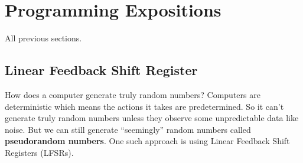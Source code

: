 \section{Programming Expositions}
\begin{topics}
All previous sections.
\end{topics}
\recalctypearea
\subsection{Linear Feedback Shift Register}
How does a computer generate truly random numbers? Computers are deterministic which means the actions it takes are predetermined. So it can’t generate truly random numbers unless they observe some unpredictable data like noise. But we can still generate “seemingly” random numbers called \textbf{pseudorandom numbers}. One such approach is using Linear Feedback Shift Registers (LFSRs).

